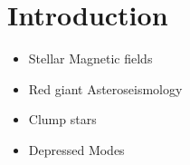 \section{Introduction}
\label{intro}

\begin{itemize}
\item Stellar Magnetic fields
\item Red giant Asteroseismology
\item Clump stars
\item Depressed Modes
\end{itemize}


  